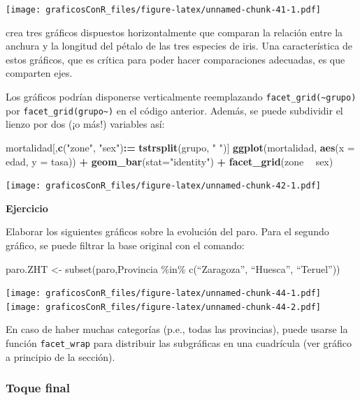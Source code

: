 \documentclass[]{article}
\newenvironment{Shaded}{\begin{snugshade}}{\end{snugshade}}
\newcommand{\DataTypeTok}[1]{\textcolor[rgb]{0.13,0.29,0.53}{#1}}
\newcommand{\ErrorTok}[1]{\textcolor[rgb]{0.64,0.00,0.00}{\textbf{#1}}}
\newcommand{\KeywordTok}[1]{\textcolor[rgb]{0.13,0.29,0.53}{\textbf{#1}}}
\newcommand{\NormalTok}[1]{#1}
\newcommand{\OperatorTok}[1]{\textcolor[rgb]{0.81,0.36,0.00}{\textbf{#1}}}
\newcommand{\StringTok}[1]{\textcolor[rgb]{0.31,0.60,0.02}{#1}}
\newcounter{ejcnt}[section]
\numberwithin{ejcnt}{section}
\newenvironment{ej}[1][]{%
	\refstepcounter{ejcnt}%
	\par\medskip%
	\noindent%
	\textbf{Ejercicio \theejcnt \;\;}%
	\rmfamily%
}{\medskip}
\begin{document}
\texttt{[image: graficosConR\_files/figure-latex/unnamed-chunk-41-1.pdf]}

crea tres gráficos dispuestos horizontalmente que comparan la relación entre la anchura y la longitud del pétalo de las tres especies de iris. Una característica de estos gráficos, que es crítica para poder hacer comparaciones adecuadas, es que comparten ejes.

Los gráficos podrían disponerse verticalmente reemplazando \texttt{facet\_grid(\textasciitilde{}grupo)} por \texttt{facet\_grid(grupo\textasciitilde{})} en el código anterior. Además, se puede subdividir el lienzo por dos (¡o más!) variables así:

\begin{Shaded}
\begin{Highlighting}[]
\NormalTok{mortalidad[,}\KeywordTok{c}\NormalTok{(}\StringTok{"zone"}\NormalTok{, }\StringTok{"sex"}\NormalTok{)}\OperatorTok{:}\ErrorTok{=}\StringTok{ }\KeywordTok{tstrsplit}\NormalTok{(grupo, }\StringTok{" "}\NormalTok{)]}
\KeywordTok{ggplot}\NormalTok{(mortalidad, }\KeywordTok{aes}\NormalTok{(}\DataTypeTok{x =}\NormalTok{ edad, }\DataTypeTok{y =}\NormalTok{ tasa)) }\OperatorTok{+}\StringTok{ }
\StringTok{  }\KeywordTok{geom_bar}\NormalTok{(}\DataTypeTok{stat=}\StringTok{"identity"}\NormalTok{) }\OperatorTok{+}
\StringTok{  }\KeywordTok{facet_grid}\NormalTok{(zone }\OperatorTok{~}\StringTok{ }\NormalTok{sex)}
\end{Highlighting}
\end{Shaded}

\texttt{[image: graficosConR\_files/figure-latex/unnamed-chunk-42-1.pdf]}

\begin{ej}
Elaborar los siguientes gráficos sobre la evolución del paro. Para el
segundo gráfico, se puede filtrar la base original con el comando:

paro.ZHT \textless- subset(paro,Provincia \%in\% c(``Zaragoza'',
``Huesca'', ``Teruel''))
\end{ej}

\texttt{[image: graficosConR\_files/figure-latex/unnamed-chunk-44-1.pdf]} \texttt{[image: graficosConR\_files/figure-latex/unnamed-chunk-44-2.pdf]}

En caso de haber muchas categorías (p.e., todas las provincias), puede usarse la función \texttt{facet\_wrap} para distribuir las subgráficas en una cuadrícula (ver gráfico a principio de la sección).

\hypertarget{toque-final}{%
\subsubsection{Toque final}\label{toque-final}}
\end{document}
